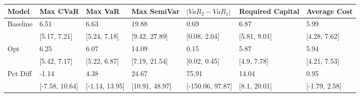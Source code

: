\begin{tabular}{lllllll}
\toprule
   Model &       Max CVaR &        Max VaR &    Max SemiVar & $|VaR_2 - VaR_1|$ & Required Capital &  Average Cost \\
\midrule
Baseline &           6.51 &           6.63 &          19.88 &              0.69 &             6.87 &          5.99 \\
         &   [5.17, 7.21] &   [5.24, 7.18] &  [9.42, 27.89] &      [0.08, 2.04] &     [5.81, 9.01] &  [4.28, 7.62] \\
     Opt &           6.25 &           6.07 &          14.09 &              0.15 &             5.87 &          5.94 \\
         &   [5.42, 7.17] &   [5.22, 6.87] &  [7.19, 21.54] &      [0.02, 0.45] &      [4.9, 7.78] &  [4.21, 7.53] \\
Pct Diff &          -1.14 &           4.38 &          24.67 &             75.91 &            14.04 &          0.95 \\
         & [-7.58, 10.64] & [-1.14, 13.95] & [10.91, 48.97] &  [-150.06, 97.87] &     [8.1, 20.01] & [-1.79, 2.58] \\
\bottomrule
\end{tabular}
